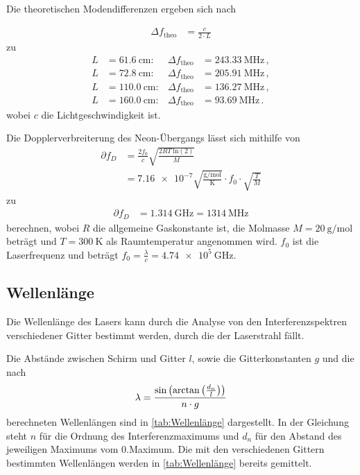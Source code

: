 Die theoretischen Modendifferenzen ergeben sich nach

\begin{align*}
  \Delta f_{\text{theo}} &= \frac{c}{2 \cdot L}
\end{align*}
zu 
\begin{align*}
  L &= \SI{ 61.6}{\centi\meter}: & \Delta f_\text{theo} &= \SI{243.33}{\mega\hertz}\, , \\  
  L &= \SI{ 72.8}{\centi\meter}: & \Delta f_\text{theo} &= \SI{205.91}{\mega\hertz}\, , \\  
  L &= \SI{110.0}{\centi\meter}: & \Delta f_\text{theo} &= \SI{136.27}{\mega\hertz}\, , \\
  L &= \SI{160.0}{\centi\meter}: & \Delta f_\text{theo} &= \SI{93.69}{\mega\hertz}\, . 
\end{align*}
wobei $c$ die Lichtgeschwindigkeit ist.

Die Dopplerverbreiterung des Neon-Übergangs lässt sich mithilfe von 
\begin{align*}
  \partial f_D &= \frac{2f_0}{c} \sqrt{\frac{2RT\: \text{ln}(2)}{M}} \\
  &= \num{7.16e-7}\sqrt{\frac{\si{\gram\per\mol}}{\si{\kelvin}}} \cdot f_0 \cdot \sqrt{\frac{T}{M}}
\end{align*}
zu 
\begin{align*}
  \partial f_D &= \SI{1.314}{\giga\hertz} = \SI{1314}{\mega\hertz}
\end{align*}
berechnen, wobei $R$ die allgemeine Gaskonstante ist, die Molmasse
$M = \SI{20}{\gram\per\mol}$ beträgt und $T=\qty{300}{\kelvin}$ als Raumtemperatur angenommen wird.
$f_0$ ist die Laserfrequenz und beträgt $f_0= \frac{\lambda}{c} = \SI{4.74e5}{\giga\hertz}$.


\subsection{Wellenlänge}
\label{sub:Wellenlänge}

Die Wellenlänge des Lasers kann durch die Analyse von den Interferenzspektren verschiedener Gitter bestimmt werden, durch die der Laserstrahl fällt.

Die Abstände zwischen Schirm und Gitter $l$, sowie die Gitterkonstanten $g$ und die nach
\begin{equation*}
  \lambda = \frac{\text{sin}\left(\text{arctan}\left(\frac{d_n}{l}\right)\right)}{n \cdot g}\\
  \label{eqn:Wellenlänge}
\end{equation*}
berechneten Wellenlängen sind in \autoref{tab:Wellenlänge} dargestellt. In der Gleichung steht $n$ für die Ordnung des Interferenzmaximums und
$d_n$ für den Abstand des jeweiligen Maximums vom 0.Maximum.
Die mit den verschiedenen Gittern bestimmten Wellenlängen werden in \autoref{tab:Wellenlänge} bereits gemittelt.


